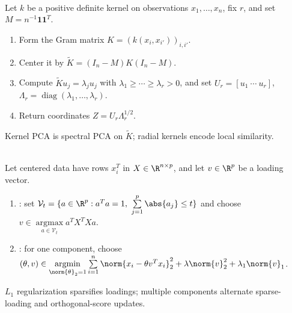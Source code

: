 \begin{method} \label{meth:sl-kernel-pca} \\
Let $k$ be a positive definite kernel on observations $x_1,\ldots,x_n$, fix $r$, and set $M=n^{-1}\mathbf{1}\mathbf{1}^T$.
\begin{enumerate}[label=(\roman*)]
\setlength{\itemsep}{0pt}
\item Form the Gram matrix $K=(k(x_i,x_{i'}))_{i,i'}$.
\item Center it by $\widetilde{K}=(I_n-M)K(I_n-M)$.
\item Compute $\widetilde{K}u_j=\lambda_ju_j$ with $\lambda_1\geq\cdots\geq\lambda_r>0$, and set $U_r=[u_1\ \cdots\ u_r]$, $\Lambda_r=\operatorname{diag}(\lambda_1,\ldots,\lambda_r)$.
\item Return coordinates $Z=U_r\Lambda_r^{1/2}$.
\end{enumerate}
Kernel PCA is spectral PCA on $\widetilde{K}$; radial kernels encode local similarity.
\end{method}

\begin{method} \label{meth:sl-sparse-pca-objectives} \\
Let centered data have rows $x_i^T$ in $X\in\R^{n\times p}$, and let $v\in\R^p$ be a loading vector.
\begin{enumerate}[label=(\roman*)]
\setlength{\itemsep}{0pt}
\item {}: set $\mathcal{V}_t=\{a\in\R^p:a^Ta=1,\ \sum\limits_{j=1}^p\abs{a_j}\leq t\}$ and choose $v\in\operatorname*{argmax}\limits_{a\in\mathcal{V}_t}a^TX^TXa$.
\item {}: for one component, choose $(\theta,v)\in\operatorname*{argmin}\limits_{\norm{\theta}_2=1}\sum\limits_{i=1}^n\norm{x_i-\theta v^Tx_i}_2^2+\lambda\norm{v}_2^2+\lambda_1\norm{v}_1$.
\end{enumerate}
$L_1$ regularization sparsifies loadings; multiple components alternate sparse-loading and orthogonal-score updates.
\end{method}

